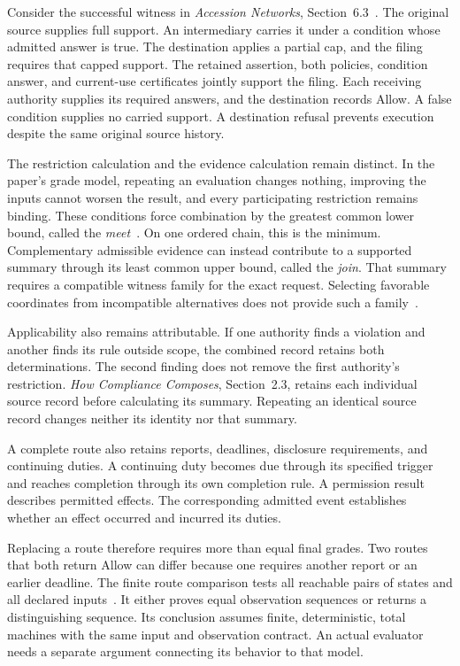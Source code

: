 \documentclass{momentum}
\begin{document}
Consider the successful witness in \emph{Accession Networks}, Section~6.3~\cite{accession}.
The original source supplies full support.
An intermediary carries it under a condition whose admitted answer is true.
The destination applies a partial cap, and the filing requires that capped support.
The retained assertion, both policies, condition answer, and current-use certificates jointly support the filing.
Each receiving authority supplies its required answers, and the destination records Allow.
A false condition supplies no carried support.
A destination refusal prevents execution despite the same original source history.

The restriction calculation and the evidence calculation remain distinct.
In the paper's grade model, repeating an evaluation changes nothing, improving the inputs cannot worsen the result, and every participating restriction remains binding.
These conditions force combination by the greatest common lower bound, called the \emph{meet}~\cite[Section~2.1, Proposition~2.2]{compliance}.
On one ordered chain, this is the minimum.
Complementary admissible evidence can instead contribute to a supported summary through its least common upper bound, called the \emph{join}.
That summary requires a compatible witness family for the exact request.
Selecting favorable coordinates from incompatible alternatives does not provide such a family~\cite[Sections~3.3 and~5.5]{compliance}.

Applicability also remains attributable.
If one authority finds a violation and another finds its rule outside scope, the combined record retains both determinations.
The second finding does not remove the first authority's restriction.
\emph{How Compliance Composes}, Section~2.3, retains each individual source record before calculating its summary.
Repeating an identical source record changes neither its identity nor that summary.

A complete route also retains reports, deadlines, disclosure requirements, and continuing duties.
A continuing duty becomes due through its specified trigger and reaches completion through its own completion rule.
A permission result describes permitted effects.
The corresponding admitted event establishes whether an effect occurred and incurred its duties.

Replacing a route therefore requires more than equal final grades.
Two routes that both return Allow can differ because one requires another report or an earlier deadline.
The finite route comparison tests all reachable pairs of states and all declared inputs~\cite[Section~5.7, Theorem~5.25]{compliance}.
It either proves equal observation sequences or returns a distinguishing sequence.
Its conclusion assumes finite, deterministic, total machines with the same input and observation contract.
An actual evaluator needs a separate argument connecting its behavior to that model.
\end{document}
